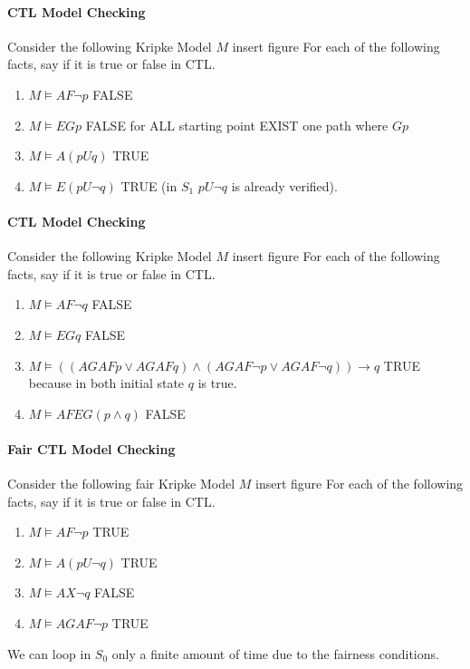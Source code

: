 \documentclass[11pt]{article}
\begin{document}
\paragraph{CTL Model Checking} %
\label{par:ctl_model_checking}
Consider the following Kripke Model $M$
insert figure
For each of the following facts, say if it is true or false in CTL.
\begin{enumerate}
	\item $M \models AF \lnot p$ FALSE
	\item $M \models EGp$ FALSE for ALL starting point EXIST one path where $Gp$
	\item $M \models A(p U q)$ TRUE
	\item $M \models E(p U \lnot q)$ TRUE (in $S_1$ $pU\lnot q$ is already verified).
\end{enumerate}

\paragraph{CTL Model Checking} %
\label{par:ctl_model_checking}
Consider the following Kripke Model $M$
insert figure
For each of the following facts, say if it is true or false in CTL.
\begin{enumerate}
	\item $M \models AF \lnot q$ FALSE
	\item $M \models EGq$ FALSE
	\item $M \models ((AGAFp \lor AGAF q) \land (AGAF \lnot p \lor AGAF \lnot q)) \rightarrow q$ TRUE because in both initial state $q$ is true.
	\item $M \models AFEG (p \land q) $ FALSE 
\end{enumerate}

\paragraph{Fair CTL Model Checking} %
\label{par:ctl_model_checking}
Consider the following fair Kripke Model $M$
insert figure
For each of the following facts, say if it is true or false in CTL.
\begin{enumerate}
	\item $M \models AF \lnot p$ TRUE
	\item $M \models A(pU\lnot q)$ TRUE
	\item $M \models AX \lnot q$ FALSE
	\item $M \models AGAF \lnot p$ TRUE
\end{enumerate}
We can loop in $S_0$ only a finite amount of time due to the fairness conditions.
\end{document}
